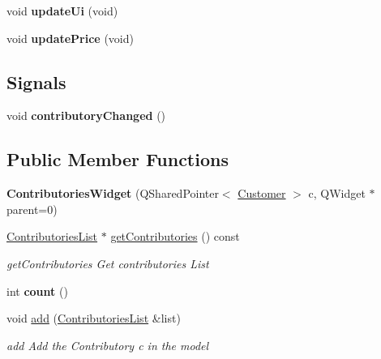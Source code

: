 \begin{DoxyCompactItemize}
\item 
\hypertarget{classGui_1_1Widgets_1_1ContributoriesWidget_a5231cbde89d73ccdbb734e6aee0cb3ff}{void {\bfseries update\-Ui} (void)}\label{classGui_1_1Widgets_1_1ContributoriesWidget_a5231cbde89d73ccdbb734e6aee0cb3ff}

\item 
\hypertarget{classGui_1_1Widgets_1_1ContributoriesWidget_ad6c925eaf605e1b0382b0ec00eac5abf}{void {\bfseries update\-Price} (void)}\label{classGui_1_1Widgets_1_1ContributoriesWidget_ad6c925eaf605e1b0382b0ec00eac5abf}

\end{DoxyCompactItemize}
\subsection*{Signals}
\begin{DoxyCompactItemize}
\item 
\hypertarget{classGui_1_1Widgets_1_1ContributoriesWidget_a510bfd755cf271fd10b63cf68284cd02}{void {\bfseries contributory\-Changed} ()}\label{classGui_1_1Widgets_1_1ContributoriesWidget_a510bfd755cf271fd10b63cf68284cd02}

\end{DoxyCompactItemize}
\subsection*{Public Member Functions}
\begin{DoxyCompactItemize}
\item 
\hypertarget{classGui_1_1Widgets_1_1ContributoriesWidget_a5517afc134491eb118b9d183e94476bc}{{\bfseries Contributories\-Widget} (Q\-Shared\-Pointer$<$ \hyperlink{classModels_1_1Customer}{Customer} $>$ c, Q\-Widget $\ast$parent=0)}\label{classGui_1_1Widgets_1_1ContributoriesWidget_a5517afc134491eb118b9d183e94476bc}

\item 
\hyperlink{classModels_1_1ContributoriesList}{Contributories\-List} $\ast$ \hyperlink{classGui_1_1Widgets_1_1ContributoriesWidget_a72c0f4a49aaafdf045154bafb1e76049}{get\-Contributories} () const 
\begin{DoxyCompactList}\small\item\em get\-Contributories Get contributories List \end{DoxyCompactList}\item 
\hypertarget{classGui_1_1Widgets_1_1ContributoriesWidget_a7c9f1bfcac92d4813f1d43b46319042b}{int {\bfseries count} ()}\label{classGui_1_1Widgets_1_1ContributoriesWidget_a7c9f1bfcac92d4813f1d43b46319042b}

\item 
void \hyperlink{classGui_1_1Widgets_1_1ContributoriesWidget_ae61498391d4aaf199bed8183961d515c}{add} (\hyperlink{classModels_1_1ContributoriesList}{Contributories\-List} \&list)
\begin{DoxyCompactList}\small\item\em add Add the Contributory {\itshape c} in the model \end{DoxyCompactList}\end{DoxyCompactItemize}


